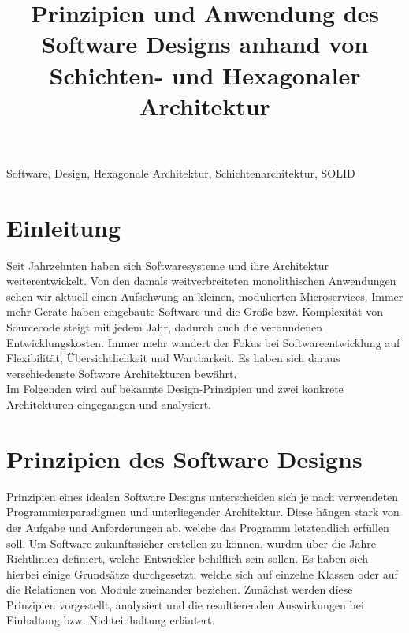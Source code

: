 \documentclass[conference]{IEEEtran}
\begin{document}

\title{Prinzipien und Anwendung des Software Designs anhand von Schichten- und Hexagonaler Architektur}

\author{
}

\maketitle


\begin{abstract}
\end{abstract}

\begin{IEEEkeywords}
Software, Design, Hexagonale Architektur, Schichtenarchitektur, SOLID
\end{IEEEkeywords}



\section{Einleitung}
Seit Jahrzehnten haben sich Softwaresysteme und ihre Architektur weiterentwickelt. Von den damals weitverbreiteten monolithischen Anwendungen sehen wir aktuell einen Aufschwung an kleinen, modulierten Microservices. Immer mehr Geräte haben eingebaute Software und die Größe bzw. Komplexität von Sourcecode steigt mit jedem Jahr, dadurch auch die verbundenen Entwicklungskosten. Immer mehr wandert der Fokus bei  Softwareentwicklung auf Flexibilität, Übersichtlichkeit und Wartbarkeit. Es haben sich daraus verschiedenste Software Architekturen bewährt. \\
Im Folgenden wird auf bekannte Design-Prinzipien und zwei konkrete Architekturen eingegangen und analysiert.



\section{Prinzipien des Software Designs}

Prinzipien eines idealen Software Designs unterscheiden sich je nach verwendeten Programmierparadigmen und unterliegender Architektur. Diese hängen stark von der Aufgabe und Anforderungen ab, welche das Programm letztendlich erfüllen soll. Um Software zukunftssicher erstellen zu können, wurden über die Jahre Richtlinien definiert, welche Entwickler behilflich sein sollen. Es haben sich hierbei einige Grundsätze durchgesetzt, welche sich auf einzelne Klassen oder auf die Relationen von Module zueinander beziehen. Zunächst werden diese Prinzipien vorgestellt, analysiert und die resultierenden Auswirkungen bei Einhaltung bzw. Nichteinhaltung erläutert.
\end{document}
